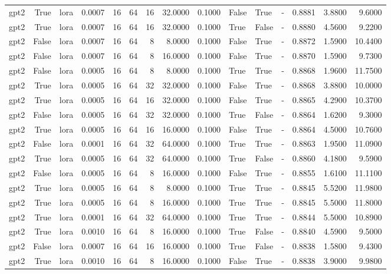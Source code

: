 \begin{tabular}{lrlrrrrrrlllrrr}
gpt2 & True & lora & 0.0007 & 16 & 64 & 16 & 32.0000 & 0.1000 & False & True & - & 0.8881 & 3.8800 & 9.6000 \\
gpt2 & True & lora & 0.0007 & 16 & 64 & 16 & 32.0000 & 0.1000 & True & False & - & 0.8880 & 4.5600 & 9.2200 \\
gpt2 & False & lora & 0.0007 & 16 & 64 & 8 & 8.0000 & 0.1000 & False & True & - & 0.8872 & 1.5900 & 10.4400 \\
gpt2 & False & lora & 0.0007 & 16 & 64 & 8 & 16.0000 & 0.1000 & False & True & - & 0.8870 & 1.5900 & 9.7300 \\
gpt2 & False & lora & 0.0005 & 16 & 64 & 8 & 8.0000 & 0.1000 & True & True & - & 0.8868 & 1.9600 & 11.7500 \\
gpt2 & True & lora & 0.0005 & 16 & 64 & 32 & 32.0000 & 0.1000 & False & True & - & 0.8868 & 3.8800 & 10.0000 \\
gpt2 & True & lora & 0.0005 & 16 & 64 & 16 & 32.0000 & 0.1000 & False & True & - & 0.8865 & 4.2900 & 10.3700 \\
gpt2 & False & lora & 0.0005 & 16 & 64 & 32 & 32.0000 & 0.1000 & True & False & - & 0.8864 & 1.6200 & 9.3000 \\
gpt2 & True & lora & 0.0005 & 16 & 64 & 16 & 16.0000 & 0.1000 & False & True & - & 0.8864 & 4.5000 & 10.7600 \\
gpt2 & False & lora & 0.0001 & 16 & 64 & 32 & 64.0000 & 0.1000 & True & True & - & 0.8863 & 1.9500 & 11.0900 \\
gpt2 & True & lora & 0.0005 & 16 & 64 & 32 & 64.0000 & 0.1000 & True & False & - & 0.8860 & 4.1800 & 9.5900 \\
gpt2 & False & lora & 0.0005 & 16 & 64 & 8 & 16.0000 & 0.1000 & False & True & - & 0.8855 & 1.6100 & 11.1100 \\
gpt2 & True & lora & 0.0005 & 16 & 64 & 8 & 8.0000 & 0.1000 & True & True & - & 0.8845 & 5.5200 & 11.9800 \\
gpt2 & True & lora & 0.0005 & 16 & 64 & 8 & 16.0000 & 0.1000 & True & True & - & 0.8845 & 5.5000 & 11.8000 \\
gpt2 & True & lora & 0.0001 & 16 & 64 & 32 & 64.0000 & 0.1000 & True & True & - & 0.8844 & 5.5000 & 10.8900 \\
gpt2 & True & lora & 0.0010 & 16 & 64 & 8 & 16.0000 & 0.1000 & True & False & - & 0.8840 & 4.5900 & 9.5000 \\
gpt2 & False & lora & 0.0007 & 16 & 64 & 16 & 16.0000 & 0.1000 & True & False & - & 0.8838 & 1.5800 & 9.4300 \\
gpt2 & True & lora & 0.0010 & 16 & 64 & 8 & 16.0000 & 0.1000 & False & True & - & 0.8838 & 3.9000 & 9.9800 \\

\end{tabular}
